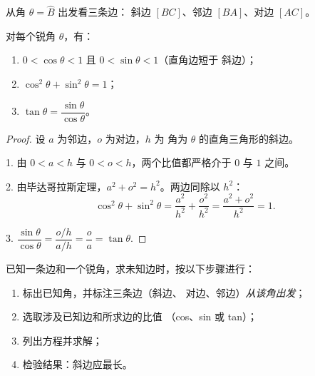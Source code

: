 \begin{omfigure}

{\small 从角 $\theta = \widehat B$ 出发看三条边：
斜边 $[BC]$、邻边 $[BA]$、对边 $[AC]$。}
\end{omfigure}

\begin{proposition}[基本性质]\label{prop:g9:trig:properties}
对每个锐角 $\theta$，有：
\begin{enumerate}
  \item $0 < \cos\theta < 1$ 且 $0 < \sin\theta < 1$（直角边短于
        斜边）；
  \item $\cos^2\theta + \sin^2\theta = 1$；
  \item $\tan\theta = \dfrac{\sin\theta}{\cos\theta}$。
\end{enumerate}
\end{proposition}

\begin{proof}
设 $a$ 为邻边，$o$ 为对边，$h$ 为
角为 $\theta$ 的直角三角形的斜边。

1. 由 $0 < a < h$ 与 $0 < o < h$，两个比值都严格介于
$0$ 与 $1$ 之间。

2. 由毕达哥拉斯定理，$a^2 + o^2 = h^2$。两边同除以 $h^2$：
\[
\cos^2\theta + \sin^2\theta
= \frac{a^2}{h^2} + \frac{o^2}{h^2}
= \frac{a^2 + o^2}{h^2} = 1 .
\]

3. $\dfrac{\sin\theta}{\cos\theta} = \dfrac{o/h}{a/h} = \dfrac oa
= \tan\theta$.
\end{proof}

\begin{method}[求边长]\label{met:g9:trig:side}
已知一条边和一个锐角，求未知边时，按以下步骤进行：
\begin{enumerate}
  \item 标出已知角，并标注三条边（斜边、
        对边、邻边）\emph{从该角出发}；
  \item 选取涉及已知边和所求边的比值
        （cos、sin 或 tan）；
  \item 列出方程并求解；
  \item 检验结果：斜边应最长。
\end{enumerate}
\end{method}

